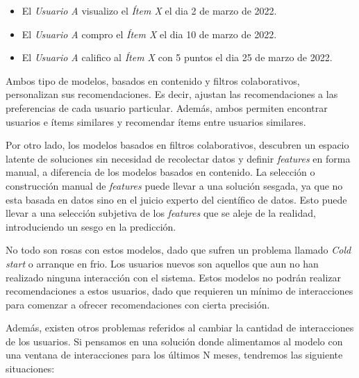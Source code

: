 \documentclass[11pt,a4paper,twoside]{thesis}
\begin{document}
\begin{itemize}
	\item El \textit{Usuario A} visualizo el \textit{Ítem X} el dia 2 de marzo de 2022.
	\item El \textit{Usuario A} compro el \textit{Ítem X} el dia 10 de marzo de 2022.
	\item El \textit{Usuario A} califico al \textit{Ítem X} con 5 puntos el dia 25 de
	      marzo de 2022.
\end{itemize}

Ambos tipo de modelos, basados en contenido y filtros colaborativos,
personalizan sus recomendaciones. Es decir, ajustan las recomendaciones a las
preferencias de cada usuario particular. Además, ambos permiten encontrar
usuarios e ítems similares y recomendar ítems entre usuarios similares.

Por otro lado, los modelos basados en filtros colaborativos, descubren un
espacio latente de soluciones sin necesidad de recolectar datos y definir
\textit{features} en forma manual, a diferencia de los modelos basados en
contenido. La selección o construcción manual de \textit{features} puede llevar
a una solución sesgada, ya que no esta basada en datos sino en el juicio
experto del científico de datos. Esto puede llevar a una selección subjetiva de
los \textit{features} que se aleje de la realidad, introduciendo un sesgo en la
predicción.

No todo son rosas con estos modelos, dado que sufren un problema llamado
\textit{Cold start} o arranque en frio. Los usuarios nuevos son aquellos que
aun no han realizado ninguna interacción con el sistema. Estos modelos no
podrán realizar recomendaciones a estos usuarios, dado que requieren un mínimo
de interacciones para comenzar a ofrecer recomendaciones con cierta precisión.

Además, existen otros problemas referidos al cambiar la cantidad de
interacciones de los usuarios. Si pensamos en una solución donde alimentamos al
modelo con una ventana de interacciones para los últimos N meses, tendremos las
siguiente situaciones:
\end{document}
